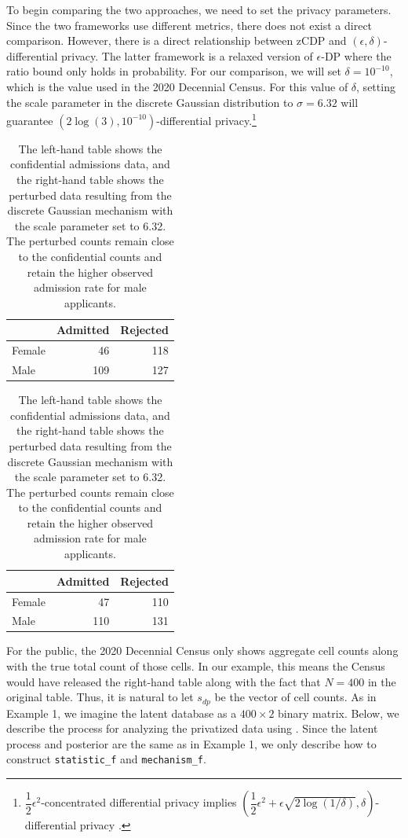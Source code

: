 To begin comparing the two approaches, we need to set the privacy parameters.
Since the two frameworks use different metrics, there does not exist
a direct comparison. However, there is a direct relationship between
zCDP and \((\epsilon, \delta)\)-differential privacy. The latter framework
is a relaxed version of \(\epsilon\)-DP where the ratio bound only holds
in probability. For our comparison, we will set \(\delta = 10^{-10}\), which
is the value used in the 2020 Decennial Census.
For this value of \(\delta\), setting the scale parameter in the discrete Gaussian
distribution to \(\sigma = 6.32\) will guarantee \((2\log(3), 10^{-10})\)-differential privacy.\footnote{\(\dfrac{1}{2} \epsilon^2\)-concentrated differential privacy implies \(\left(\dfrac{1}{2}\epsilon^2 + \epsilon \sqrt{2\log(1/\delta)}, \delta\right)\)-differential privacy \citep{Bun2016}.}

\begin{table}
\centering\caption{\label{tab:admissions-dg}The left-hand table shows the confidential admissions data, and the right-hand table shows the perturbed data resulting from the discrete Gaussian mechanism with the scale parameter set to 6.32. The perturbed counts remain close to the confidential counts and retain the higher observed admission rate for male applicants.}

\centering
\begin{tabular}[t]{lrr}
\toprule
  & Admitted & Rejected\\
\midrule
Female & 46 & 118\\
Male & 109 & 127\\
\bottomrule
\end{tabular}
\centering
\begin{tabular}[t]{lrr}
\toprule
  & Admitted & Rejected\\
\midrule
Female & 47 & 110\\
Male & 110 & 131\\
\bottomrule
\end{tabular}
\end{table}

For the public, the 2020 Decennial Census only shows aggregate cell counts along with
the true total count of those cells. In our example,
this means the Census would have released the right-hand
table along with the fact that \(N = 400\) in the original
table. Thus, it is natural to let \(s_{dp}\) be the vector of cell counts. As in
Example 1, we imagine the latent database as a
\(400 \times 2\) binary matrix. Below,
we describe the process for analyzing the privatized
data using . Since the latent process
and posterior are the same as in Example 1, we only describe
how to construct \texttt{statistic\_f} and \texttt{mechanism\_f}.


